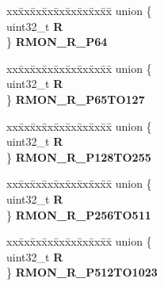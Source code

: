 \begin{DoxyCompactItemize}
\begin{tabbing}
\end{tabbing}\item 
\mbox{\label{structFEC__tag_a95d3dc8c9e72197219992f1a9d02817f}} 
\begin{tabbing}
xx\=xx\=xx\=xx\=xx\=xx\=xx\=xx\=xx\=\kill
union \{\\
\>uint32\_t {\bfseries R}\\
\} {\bfseries RMON\_R\_P64}\\

\end{tabbing}\item 
\mbox{\label{structFEC__tag_a74e5eb5b2714608e1b014f0ef71033be}} 
\begin{tabbing}
xx\=xx\=xx\=xx\=xx\=xx\=xx\=xx\=xx\=\kill
union \{\\
\>uint32\_t {\bfseries R}\\
\} {\bfseries RMON\_R\_P65TO127}\\

\end{tabbing}\item 
\mbox{\label{structFEC__tag_a2e6cf05291a3a69e4b2ef30222e5de4b}} 
\begin{tabbing}
xx\=xx\=xx\=xx\=xx\=xx\=xx\=xx\=xx\=\kill
union \{\\
\>uint32\_t {\bfseries R}\\
\} {\bfseries RMON\_R\_P128TO255}\\

\end{tabbing}\item 
\mbox{\label{structFEC__tag_a69808a96b3fdac45e350eb46c0003ab8}} 
\begin{tabbing}
xx\=xx\=xx\=xx\=xx\=xx\=xx\=xx\=xx\=\kill
union \{\\
\>uint32\_t {\bfseries R}\\
\} {\bfseries RMON\_R\_P256TO511}\\

\end{tabbing}\item 
\mbox{\label{structFEC__tag_aeccf2f64d7e373c9252d20eda34eef7e}} 
\begin{tabbing}
xx\=xx\=xx\=xx\=xx\=xx\=xx\=xx\=xx\=\kill
union \{\\
\>uint32\_t {\bfseries R}\\
\} {\bfseries RMON\_R\_P512TO1023}\\


\end{tabbing}
\end{DoxyCompactItemize}
